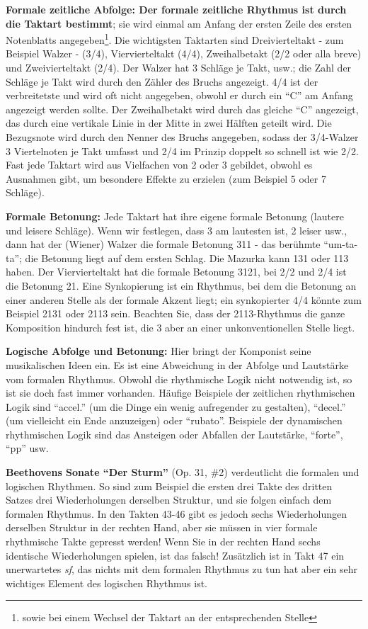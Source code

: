 \textbf{Formale zeitliche Abfolge:
Der formale zeitliche Rhythmus ist durch die Taktart bestimmt}; sie wird einmal am Anfang der ersten Zeile des ersten Notenblatts angegeben\footnote{sowie bei einem Wechsel der Taktart an der entsprechenden Stelle}.
Die wichtigsten Taktarten sind Dreivierteltakt - zum Beispiel Walzer - (3/4), Viervierteltakt (4/4), Zweihalbetakt (2/2 oder alla breve) und Zweivierteltakt (2/4).
Der Walzer hat 3 Schläge je Takt, usw.; die Zahl der Schläge je Takt wird durch den Zähler des Bruchs angezeigt. 
4/4 ist der verbreitetste und wird oft nicht angegeben, obwohl er durch ein \enquote{C} am Anfang angezeigt werden sollte.
Der Zweihalbetakt wird durch das gleiche \enquote{C} angezeigt, das durch eine vertikale Linie in der Mitte in zwei Hälften geteilt wird.
Die Bezugsnote wird durch den Nenner des Bruchs angegeben, sodass der 3/4-Walzer 3 Viertelnoten je Takt umfasst und 2/4 im Prinzip doppelt so schnell ist wie 2/2.
Fast jede Taktart wird aus Vielfachen von 2 oder 3 gebildet, obwohl es Ausnahmen gibt, um besondere Effekte zu erzielen (zum Beispiel 5 oder 7 Schläge).

\textbf{Formale Betonung:}
Jede Taktart hat ihre eigene formale Betonung (lautere und leisere Schläge).
Wenn wir festlegen, dass 3 am lautesten ist, 2 leiser usw., dann hat der (Wiener) Walzer die formale Betonung 311 - das berühmte \enquote{um-ta-ta}; die Betonung liegt auf dem ersten Schlag.
Die Mazurka kann 131 oder 113 haben. 
Der Viervierteltakt hat die formale Betonung 3121, bei 2/2 und 2/4 ist die Betonung 21.
Eine Synkopierung ist ein Rhythmus, bei dem die Betonung an einer anderen Stelle als der formale Akzent liegt; ein synkopierter 4/4 könnte zum Beispiel 2131 oder 2113 sein.
Beachten Sie, dass der 2113-Rhythmus die ganze Komposition hindurch fest ist, die 3 aber an einer unkonventionellen Stelle liegt.

\textbf{Logische Abfolge und Betonung:}
Hier bringt der Komponist seine musikalischen Ideen ein.
Es ist eine Abweichung in der Abfolge und Lautstärke vom formalen Rhythmus.
Obwohl die rhythmische Logik nicht notwendig ist, so ist sie doch fast immer vorhanden.
Häufige Beispiele der zeitlichen rhythmischen Logik sind \enquote{accel.} (um die Dinge ein wenig aufregender zu gestalten), \enquote{decel.} (um vielleicht ein Ende anzuzeigen) oder \enquote{rubato}.
Beispiele der dynamischen rhythmischen Logik sind das Ansteigen oder Abfallen der Lautstärke, \enquote{forte}, \enquote{pp} usw.

\textbf{Beethovens Sonate \enquote{Der Sturm}} (Op. 31, \#2) verdeutlicht die formalen und logischen Rhythmen.
So sind zum Beispiel die ersten drei Takte des dritten Satzes drei Wiederholungen derselben Struktur, und sie folgen einfach dem formalen Rhythmus.
In den Takten 43-46 gibt es jedoch sechs Wiederholungen derselben Struktur in der rechten Hand, aber sie müssen in vier formale rhythmische Takte gepresst werden!
Wenn Sie in der rechten Hand sechs identische Wiederholungen spielen, ist das falsch!
Zusätzlich ist in Takt 47 ein unerwartetes \textit{sf}, das nichts mit dem formalen Rhythmus zu tun hat aber ein sehr wichtiges Element des logischen Rhythmus ist.


